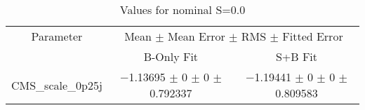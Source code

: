 \begin{table}
\centering
\caption{Values for nominal S=0.0}
\begin{tabular}{ccc}
\toprule
Parameter & \multicolumn{2}{c}{Mean $\pm$ Mean Error $\pm$ RMS $\pm$ Fitted Error}\\
 & B-Only Fit & S+B Fit\\
\midrule
CMS\_scale\_0p25j & \num{-1.13695} $\pm$ \num{0} $\pm$ \num{0} $\pm$ \num{0.792337} & \num{-1.19441} $\pm$ \num{0} $\pm$ \num{0} $\pm$ \num{0.809583}\\
\bottomrule
\end{tabular}
\end{table}